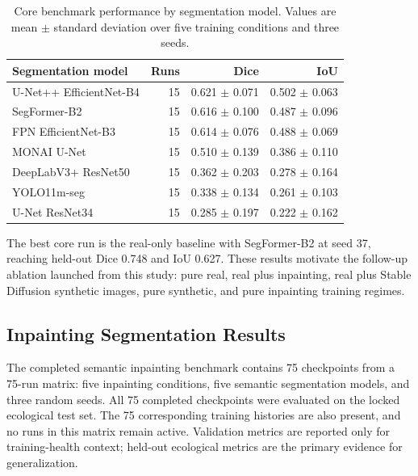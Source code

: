 \documentclass{article}
\begin{document}
\begin{table}[H]
  \centering
  \caption{Core benchmark performance by segmentation model. Values are mean $\pm$ standard deviation over five training conditions and three seeds.}
  \label{tab:core-model-results}
  \begin{tabular}{lrrr}
    \toprule
    \textbf{Segmentation model} & \textbf{Runs} & \textbf{Dice} & \textbf{IoU} \\
    \midrule
    U-Net++ EfficientNet-B4 & 15 & 0.621 $\pm$ 0.071 & 0.502 $\pm$ 0.063 \\
    SegFormer-B2 & 15 & 0.616 $\pm$ 0.100 & 0.487 $\pm$ 0.096 \\
    FPN EfficientNet-B3 & 15 & 0.614 $\pm$ 0.076 & 0.488 $\pm$ 0.069 \\
    MONAI U-Net & 15 & 0.510 $\pm$ 0.139 & 0.386 $\pm$ 0.110 \\
    DeepLabV3+ ResNet50 & 15 & 0.362 $\pm$ 0.203 & 0.278 $\pm$ 0.164 \\
    YOLO11m-seg & 15 & 0.338 $\pm$ 0.134 & 0.261 $\pm$ 0.103 \\
    U-Net ResNet34 & 15 & 0.285 $\pm$ 0.197 & 0.222 $\pm$ 0.162 \\
    \bottomrule
  \end{tabular}
\end{table}

The best core run is the real-only baseline with SegFormer-B2 at seed 37, reaching held-out Dice 0.748 and IoU 0.627. These results motivate the follow-up ablation launched from this study: pure real, real plus inpainting, real plus Stable Diffusion synthetic images, pure synthetic, and pure inpainting training regimes.

\subsection{Inpainting Segmentation Results}

The completed semantic inpainting benchmark contains 75 checkpoints from a 75-run matrix: five inpainting conditions, five semantic segmentation models, and three random seeds. All 75 completed checkpoints were evaluated on the locked ecological test set. The 75 corresponding training histories are also present, and no runs in this matrix remain active. Validation metrics are reported only for training-health context; held-out ecological metrics are the primary evidence for generalization.
\end{document}
